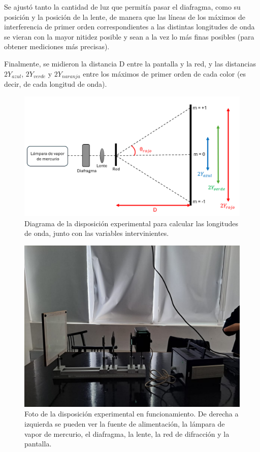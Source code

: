 \documentclass[12pt, a4paper]{article}
\begin{document}
Se ajustó tanto la cantidad de luz que permitía pasar el diafragma, como su posición y la posición de la lente, de manera que las líneas de 
los máximos de interferencia de primer orden correspondientes a las distintas longitudes de onda se vieran con la mayor nitidez posible y 
sean a la vez lo más finas posibles (para obtener mediciones más precisas). 

Finalmente, se midieron la distancia D entre la pantalla y la red, y las distancias $2Y_{azul}$, $2Y_{verde}$ y $2Y_{naranja}$ entre los 
máximos de primer orden de cada color (es decir, de cada longitud de onda).

\begin{figure}[!h] 
        \centering \includegraphics[width=0.9\columnwidth]{diagramaExperimental2.png}
        \caption{\label{fig2}Diagrama de la disposición experimental para calcular las longitudes de onda, junto con las variables 
        intervinientes.}
\end{figure}

\begin{figure}[!h] 
        \centering \includegraphics[width=0.75\columnwidth]{dispositivo3.jpg}
        \caption{\label{fig3}Foto de la disposición experimental en funcionamiento. De derecha a izquierda se pueden ver la fuente de 
        alimentación, la lámpara de vapor de mercurio, el diafragma, la lente, la red de difracción y la pantalla.}
\end{figure}
\end{document}
